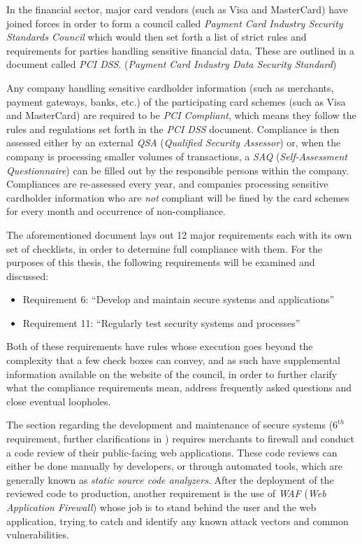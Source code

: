\documentclass[a4paper,12pt]{article}
\begin{document}
	In the financial sector, major card vendors (such as Visa and MasterCard) have joined forces in order to form a council called \textit{Payment Card Industry Security Standards Council} which would then set forth a list of strict rules and requirements for parties handling sensitive financial data. These are outlined in a document called \textit{PCI DSS}. (\textit{Payment Card Industry Data Security Standard})
	
	Any company handling sensitive cardholder information (such as merchants, payment gateways, banks, etc.) of the participating card schemes (such as Visa and MasterCard) are required to be \textit{PCI Compliant}, which means they follow the rules and regulations set forth in the \textit{PCI DSS} document. Compliance is then assessed either by an external \textit{QSA} (\textit{Qualified Security Assessor}) or, when the company is processing smaller volumes of transactions, a \textit{SAQ} (\textit{Self-Assessment Questionnaire}) can be filled out by the responsible persons within the company. Compliances are re-assessed every year, and companies processing sensitive cardholder information who are \textit{not} compliant will be fined by the card schemes for every month and occurrence of non-compliance.\cite{wfargo15}
	
	The aforementioned document lays out 12 major requirements\cite{pcidss31} each with its own set of checklists, in order to determine full compliance with them. For the purposes of this thesis, the following requirements will be examined and discussed:
	
	\begin{itemize}
		\item Requirement 6: ``Develop and maintain secure systems and applications''
		\item Requirement 11: ``Regularly test security systems and processes''
	\end{itemize}
	
	Both of these requirements have rules whose execution goes beyond the complexity that a few check boxes can convey, and as such have supplemental information available on the website of the council, in order to further clarify what the compliance requirements mean, address frequently asked questions and close eventual loopholes.
	
	The section regarding the development and maintenance of secure systems ($6^{th}$ requirement, further clarifications in \cite{pcireq6}) requires merchants to firewall and conduct a code review of their public-facing web applications. These code reviews can either be done manually by developers, or through automated tools, which are generally known as \textit{static source code analyzers}. After the deployment of the reviewed code to production, another requirement is the use of \textit{WAF} (\textit{Web Application Firewall}) whose job is to stand behind the user and the web application, trying to catch and identify any known attack vectors and common vulnerabilities.
	
\end{document}
